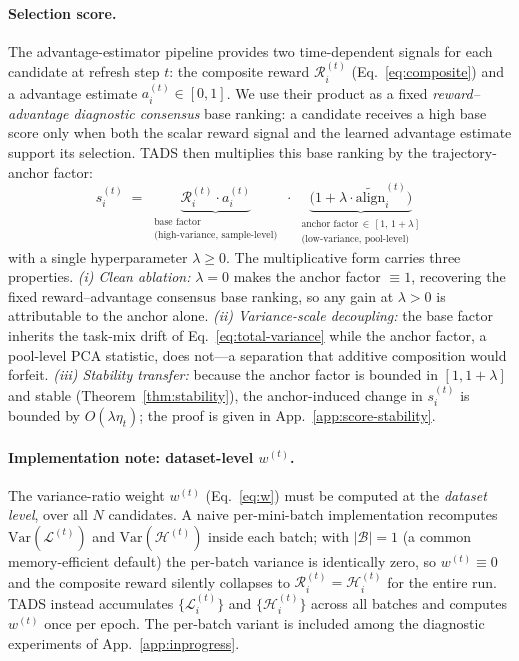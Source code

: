 \paragraph{Selection score.}
The advantage-estimator pipeline provides two time-dependent signals for
each candidate at refresh step $t$: the composite reward
$\mathcal{R}_i^{(t)}$ (Eq.~\ref{eq:composite}) and a advantage estimate
$a_i^{(t)} \in [0,1]$. We use their product as a fixed
\emph{reward--advantage diagnostic consensus} base ranking: a candidate
receives a high base score only when both the scalar reward signal
and the learned advantage estimate support its selection. \textsc{TADS}
then multiplies this base ranking by the trajectory-anchor factor:
\begin{equation}
\boxed{
\,s_i^{(t)} \;=\;
\underbrace{\mathcal{R}_i^{(t)} \cdot a_i^{(t)}}_{\substack{\text{base factor}\\[1pt] \text{(high-variance, sample-level)}}}
\;\cdot\;
\underbrace{\bigl(1 + \lambda \cdot \widetilde{\mathrm{align}}_i^{(t)}\bigr)}_{\substack{\text{anchor factor} \,\in\, [1,\,1+\lambda]\\[1pt] \text{(low-variance, pool-level)}}}\,
}
\label{eq:score}
\end{equation}
with a single hyperparameter $\lambda \ge 0$. The multiplicative
form carries three properties. \emph{(i) Clean ablation:}
$\lambda{=}0$ makes the anchor factor $\equiv 1$, recovering the
fixed reward--advantage consensus base ranking, so any gain at
$\lambda > 0$ is attributable to the anchor alone. \emph{(ii)
Variance-scale decoupling:} the base factor inherits the task-mix
drift of Eq.~\ref{eq:total-variance} while the anchor factor, a
pool-level PCA statistic, does not---a separation that additive
composition would forfeit. \emph{(iii) Stability transfer:} because
the anchor factor is bounded in $[1,1+\lambda]$ and stable
(Theorem~\ref{thm:stability}), the anchor-induced change in
$s_i^{(t)}$ is bounded by $O(\lambda\eta_t)$; the proof is given in
App.~\ref{app:score-stability}.

\paragraph{Implementation note: dataset-level $w^{(t)}$.}
The variance-ratio weight $w^{(t)}$ (Eq.~\ref{eq:w}) must be computed
at the \emph{dataset level}, over all $N$ candidates. A naive
per-mini-batch implementation recomputes
$\mathrm{Var}(\mathcal{L}^{(t)})$ and
$\mathrm{Var}(\mathcal{H}^{(t)})$ inside each batch; with
$|\mathcal{B}|{=}1$ (a common memory-efficient default) the per-batch
variance is identically zero, so $w^{(t)} \equiv 0$ and the composite
reward silently collapses to
$\mathcal{R}_i^{(t)} = \mathcal{H}_i^{(t)}$ for the entire run.
\textsc{TADS} instead accumulates
$\{\mathcal{L}_i^{(t)}\}$ and $\{\mathcal{H}_i^{(t)}\}$ across all
batches and computes $w^{(t)}$ once per epoch. The per-batch variant
is included among the diagnostic experiments of
App.~\ref{app:inprogress}.

